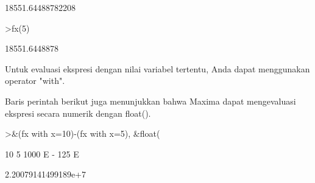 \documentclass[a4paper,10pt]{article}
\begin{document}
\begin{eulernotebook}
\begin{eulercomment}
\begin{eulercomment}
\begin{euleroutput}
  
                            18551.64488782208
  
\end{euleroutput}
\begin{eulerprompt}
>fx(5)
\end{eulerprompt}
\begin{euleroutput}
  18551.6448878
\end{euleroutput}
\begin{eulercomment}
Untuk evaluasi ekspresi dengan nilai variabel tertentu, Anda dapat
menggunakan operator "with".

Baris perintah berikut juga menunjukkan bahwa Maxima dapat
mengevaluasi ekspresi secara numerik dengan float().
\end{eulercomment}
\begin{eulerprompt}
>&(fx with x=10)-(fx with x=5), &float(%
\end{eulerprompt}
\begin{euleroutput}
  
                                  10        5
                            1000 E   - 125 E
  
  
                           2.20079141499189e+7
  

\end{euleroutput}
\end{eulercomment}
\end{eulercomment}
\end{eulernotebook}
\end{document}
